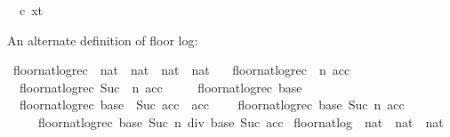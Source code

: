 \begin{isabellebody}
\ \ {\isacharparenleft}{\kern0pt}c{\isacharcomma}{\kern0pt}\ x{\isacharunderscore}{\kern0pt}t{\isacharprime}{\kern0pt}{\isacharparenright}{\kern0pt}{\isacharparenright}{\kern0pt}{\isachardoublequoteclose}%
\begin{isamarkuptext}%
An alternate definition of floor log:%
\end{isamarkuptext}\isamarkuptrue%
\isamarkupfalse%
\ floor{\isacharunderscore}{\kern0pt}nat{\isacharunderscore}{\kern0pt}log{\isacharunderscore}{\kern0pt}rec\ {\isacharcolon}{\kern0pt}{\isacharcolon}{\kern0pt}\ {\isachardoublequoteopen}nat\ {\isasymRightarrow}\ nat\ {\isasymRightarrow}\ nat\ {\isasymRightarrow}\ nat{\isachardoublequoteclose}\ \isanewline
\ \ {\isachardoublequoteopen}floor{\isacharunderscore}{\kern0pt}nat{\isacharunderscore}{\kern0pt}log{\isacharunderscore}{\kern0pt}rec\ {}\ n\ acc\ {\isacharequal}{\kern0pt}\ {}{\isachardoublequoteclose}\ {\isacharbar}{\kern0pt}\isanewline
\ \ {\isachardoublequoteopen}floor{\isacharunderscore}{\kern0pt}nat{\isacharunderscore}{\kern0pt}log{\isacharunderscore}{\kern0pt}rec\ {\isacharparenleft}{\kern0pt}Suc\ {}{\isacharparenright}{\kern0pt}\ n\ acc\ {\isacharequal}{\kern0pt}\ {}{\isachardoublequoteclose}\ {\isacharbar}{\kern0pt}\isanewline
\ \ {\isachardoublequoteopen}floor{\isacharunderscore}{\kern0pt}nat{\isacharunderscore}{\kern0pt}log{\isacharunderscore}{\kern0pt}rec\ base\ {}\ {}\ {\isacharequal}{\kern0pt}\ {}{\isachardoublequoteclose}\ {\isacharbar}{\kern0pt}\ \isanewline
\ \ {\isachardoublequoteopen}floor{\isacharunderscore}{\kern0pt}nat{\isacharunderscore}{\kern0pt}log{\isacharunderscore}{\kern0pt}rec\ base\ {}\ {\isacharparenleft}{\kern0pt}Suc\ acc{\isacharparenright}{\kern0pt}\ {\isacharequal}{\kern0pt}\ acc{\isachardoublequoteclose}\ {\isacharbar}{\kern0pt}\ \isanewline
\ \ {\isachardoublequoteopen}floor{\isacharunderscore}{\kern0pt}nat{\isacharunderscore}{\kern0pt}log{\isacharunderscore}{\kern0pt}rec\ base\ {\isacharparenleft}{\kern0pt}Suc\ n{\isacharparenright}{\kern0pt}\ acc\ \isanewline
\ \ \ \ {\isacharequal}{\kern0pt}\ floor{\isacharunderscore}{\kern0pt}nat{\isacharunderscore}{\kern0pt}log{\isacharunderscore}{\kern0pt}rec\ base\ {\isacharparenleft}{\kern0pt}{\isacharparenleft}{\kern0pt}Suc\ n{\isacharparenright}{\kern0pt}\ div\ base{\isacharparenright}{\kern0pt}\ {\isacharparenleft}{\kern0pt}Suc\ acc{\isacharparenright}{\kern0pt}{\isachardoublequoteclose}\isanewline
\isanewline
{}\isamarkupfalse%
\ floor{\isacharunderscore}{\kern0pt}nat{\isacharunderscore}{\kern0pt}log\ {\isacharcolon}{\kern0pt}{\isacharcolon}{\kern0pt}\ {\isachardoublequoteopen}nat\ {\isasymRightarrow}\ nat\ {\isasymRightarrow}\ nat{\isachardoublequoteclose}\ \isanewline

\end{isabellebody}
